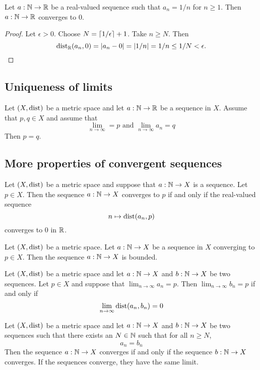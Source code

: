 \begin{example}
    Let $a: \mathbb{N} \to \mathbb{R}$ be a real-valued sequence such that $a_n = 1/n$ for $n \ge 1$. Then $a: \mathbb{N} \to \mathbb{R}$ converges to $0$.
\end{example}

\begin{proof}
    Let $\epsilon > 0$. Choose $N = \left\lceil 1/\epsilon \right\rceil + 1$. Take $n \ge N$. Then
    $$\text{dist}_{\mathbb{R}}(a_n,0) = |a_n - 0| = |1/n| = 1/n \le 1/N < \epsilon.$$
\end{proof}

\subsection{Uniqueness of limits}
\begin{proposition}
    Let $(X, \text{dist})$ be a metric space and let $a: \mathbb{N} \to \mathbb{R}$ be a sequence in $X$. Assume that $p,q \in X$ and assume that
    $$\lim_{n\to\infty} = p \text{ and } \lim_{n\to\infty}a_n = q$$
    Then $p = q$.
\end{proposition}

\subsection{More properties of convergent sequences}
\begin{proposition}
    Let $(X, \text{dist})$ be a metric space and suppose that $a: \mathbb{N} \to X$ is a sequence. Let $p \in X$. Then the sequence $a: \mathbb{N} \to X$ converges to $p$ if and only if
    the real-valued sequence
    $$n \mapsto \text{dist}(a_n, p)$$
    converges to 0 in $\mathbb{R}$.
\end{proposition}

\begin{proposition}
    Let $(X, \text{dist})$ be a metric space. Let $a: \mathbb{N} \to X$ be a sequence in $X$ converging to $p \in X$. Then the sequence $a: \mathbb{N} \to X$ is bounded.
\end{proposition}

\begin{proposition}
    Let $(X, \text{dist})$ be a metric space and let $a: \mathbb{N} \to X$ and $b: \mathbb{N} \to X$ be two sequences. Let $p \in X$ and suppose that $\lim_{n\to\infty}a_n = p$.
    Then $\lim_{n\to\infty}b_n = p$ if and only if
    $$\lim_{n\to\infty}\text{dist}(a_n,b_n) = 0$$
\end{proposition}

\begin{corollary}
    Let $(X, \text{dist})$ be a metric space and let $a: \mathbb{N} \to X$ and $b: \mathbb{N} \to X$ be two sequences such that there exists an $N \in \mathbb{N}$ such that for all $n \ge N$,
    $$a_n = b_n$$
    Then the sequence $a: \mathbb{N} \to X$ converges if and only if the sequence $b: \mathbb{N} \to X$ converges. If the sequences converge, they have the same limit.
\end{corollary}

